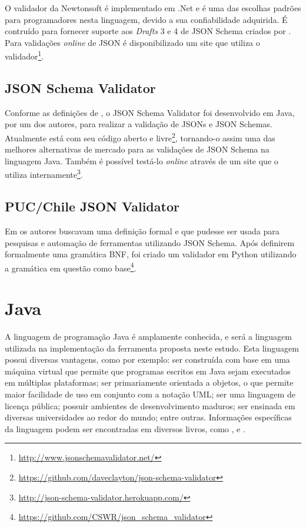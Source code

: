 O validador da Newtonsoft é implementado em .Net \cite{NEWTONSOFT} e é uma das escolhas padrões para programadores nesta linguagem, devido a sua confiabilidade adquirida. É contruído para fornecer suporte aos \textit{Drafts} 3 e 4 de JSON Schema criados por . Para validações \textit{online} de JSON é disponibilizado um site que utiliza o validador\footnote{\url{http://www.jsonschemavalidator.net/}}.

\subsection{JSON Schema Validator}

Conforme as definições de , o JSON Schema Validator foi desenvolvido em Java, por um dos autores, para realizar a validação de JSONs e JSON Schemas. Atualmente está com seu código aberto e livre\footnote{\url{https://github.com/daveclayton/json-schema-validator}}, tornando-o assim uma das melhores alternativas de mercado para as validações de JSON Schema na linguagem Java. Também é possível testá-lo \textit{online} através de um site que o utiliza internamente\footnote{\url{http://json-schema-validator.herokuapp.com/}}.


\subsection{PUC/Chile JSON Validator}

Em  os autores buscavam uma definição formal e que pudesse ser usada para pesquisas e automação de ferramentas utilizando JSON Schema. Após definirem formalmente uma gramática BNF, foi criado um validador em Python utilizando a gramática em questão como base\footnote{\url{https://github.com/CSWR/json_schema_validator}}.


\section{Java}

A linguagem de programação Java é amplamente conhecida, e será a linguagem utilizada na implementação da ferramenta proposta neste estudo. Esta linguagem possui diversas vantagens, como por exemplo: ser construída com base em uma máquina virtual que permite que programas escritos em Java sejam executados em múltiplas plataformas; ser primariamente orientada a objetos, o que permite maior facilidade de uso em conjunto com a notação UML; ser uma linguagem de licença pública; possuir ambientes de desenvolvimento maduros; ser ensinada em diversas universidades ao redor do mundo; entre outras. Informações específicas da linguagem podem ser encontradas em diversos livros, como \cite{HORSTMANN:2010}, \cite{DEITEL:1999} e \cite{GOSLING:2014}.

